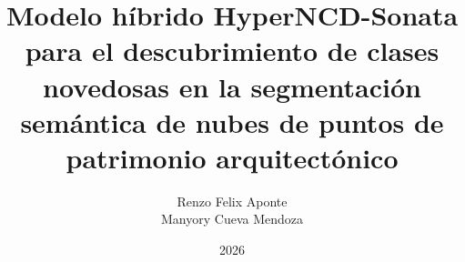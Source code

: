 \documentclass[a4paper,12pt,oneside]{tesisutec}
\begin{document}
\frontmatter


\title{Modelo híbrido HyperNCD-Sonata para el descubrimiento de clases
novedosas en la segmentación semántica de nubes de puntos de patrimonio
arquitectónico}

\author{Renzo Felix Aponte  \\
        Manyory Cueva Mendoza }

\date{2026}

\maketitle





\tableofcontents

\newpage

\listoftables

\newpage

\listoffigures


\mainmatter
\pagestyle{fancy}









\renewcommand{\bibname}{\hfill\Large\bf{REFERENCIAS BIBLIOGRÁFICAS}\hfill}





\end{document}
